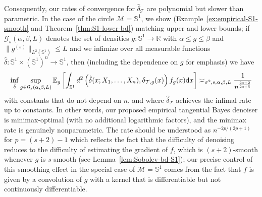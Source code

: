 \documentclass[preprint]{imsart}
\theoremstyle{plain}
\theoremstyle{definition}
\newcommand{\Rbb}{\mathbb{R}}
\newcommand{\Ebb}{\mathbb{E}}
\newcommand{\Mcal}{\mathcal{M}}
\newcommand{\diff}{\textnormal{d}}
\newcommand{\B}{\mathcal{B}}
\newcommand{\N}{\mathcal{N}}
\newcommand{\T}{\mathcal{T}}
\begin{document}
    Consequently, our rates of convergence for $\hat{\delta}_{\T}$ are polynomial but slower than parametric.
    In the case of the circle $\Mcal=\mathbb{S}^1$, we show (Example~\ref{ex:empirical-S1-smooth} and Theorem~\ref{thm:S1-lower-bd}) matching upper and lower bounds; if $\mathcal{G}_s(\alpha,\beta,L)$ denotes the set of densities $g:\mathbb{S}^1\to\Rbb$ with $\alpha\le g\le \beta$ and $\|g^{(s)}\|_{L^2(\mathbb{S}^1)}\le L$ and we infimize over all measurable functions $\hat{\delta}:\mathbb{S}^1\times(\mathbb{S}^1)^n\to \mathbb{S}^1$, then (including the dependence on $g$ for emphasis) we have
    \begin{equation}\label{eqn:S1-minimax}
        \inf_{\hat{\delta}}\sup_{g\in\mathcal{G}_s(\alpha,\beta,L)}\Ebb_g\left[\int_{\mathbb{S}^1}d^2\left(\hat{\delta}(x;X_1,\ldots, X_n),\delta_{\T,g}(x)\right)f_g(x)\diff x\right]\asymp_{\sigma^2,s,\alpha,\beta,L} \frac{1}{n^{\frac{2s+2}{2s+5}}}
    \end{equation}
    with constants that do not depend on $n$, and where $\hat{\delta}_{\T}$ achieves the infimal rate up to constants.
    In other words, our proposed empirical tangential Bayes denoiser is minimax-optimal (with no additional logarithmic factors), and the minimax rate is genuinely nonparametric.
    The rate should be understood as $n^{-2p/(2p+1)}$ for $p=(s+2)-1$ which reflects the fact that the difficulty of denoising reduces to the difficulty of estimating the gradient of $f$, which is $(s+2)$-smooth whenever $g$ is $s$-smooth (see Lemma~\ref{lem:Sobolev-bd-S1}); our precise control of this smoothing effect in the special case of $\Mcal=\mathbb{S}^1$ comes from the fact that $f$ is given by a convolution of $g$ with a kernel that is differentiable but not continuously differentiable.

\end{document}
